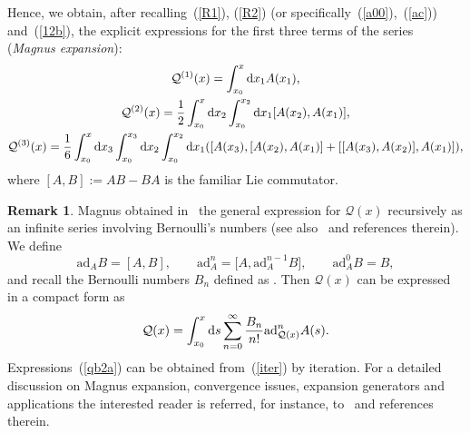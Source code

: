 \documentclass[pdftex]{sigma}
\numberwithin{equation}{section}
\theoremstyle{definition}
\newtheorem{rem}[thm]{Remark}
\begin{document}
Hence, we obtain, after recalling~(\ref{R1}), (\ref{R2}) (or specifically~(\ref{a00}),~(\ref{ac})) and~(\ref{12b}), the explicit expressions for the first three terms of the series ({\it Magnus expansion}):
\begin{gather}
{\mathcal Q}^{(1)}(x) = \int_{x_0}^x {\rm d}x_1 A(x_1), \label{qb2a} \\
{\mathcal Q}^{(2)}(x) = \frac{1}{2} \int_{x_0}^x{\rm d}x_2 \int_{x_0}^{x_2} {\rm d}x_1 [A(x_2), A(x_1) ], \nonumber \\
 {\mathcal Q}^{(3)}(x) = \frac{1}{6} \int_{x_0}^x{\rm d}x_3 \int_{x_0}^{x_3} {\rm d}x_2 \int_{x_0}^{x_2} {\rm d}x_1 ( [ A(x_3), [ A(x_2), A(x_1) ] +
 [ [ A(x_3), A(x_2) ], A(x_1) ] ), \nonumber
\end{gather}
where $ [A, B ] := AB - BA$ is the familiar Lie commutator.
\begin{rem}
Magnus obtained in~\cite{Magnus} the general expression for ${\mathcal Q}(x)$ recursively as an infinite series involving Bernoulli's numbers (see also~\cite{review} and references therein). We define
\begin{equation*}
\mbox{ad}_AB = [ A, B ], \qquad \mbox{ad}^n_A = \bigl[A, \mbox{ad}^{n-1}_AB \bigr],
\qquad \mbox{ad}^0_AB = B,
\end{equation*}
and recall the Bernoulli numbers $B_n$ defined as .
Then ${\mathcal Q}(x)$ can be expressed in a compact form as
\begin{equation}
{\mathcal Q}(x) = \int_{x_0} ^x {\rm d}s \sum_{n=0}^{\infty} \frac{B_n}{n!}\mbox{ad}^n_{{\mathcal Q}(x)}A(s). \label{iter}
\end{equation}
Expressions~(\ref{qb2a}) can be obtained from~(\ref{iter}) by iteration. For a detailed discussion on Magnus expansion, convergence issues, expansion generators and applications the interested reader is referred, for instance, to~\cite{review, EbraMan, Fer} and references therein.
\end{rem}
\end{document}
